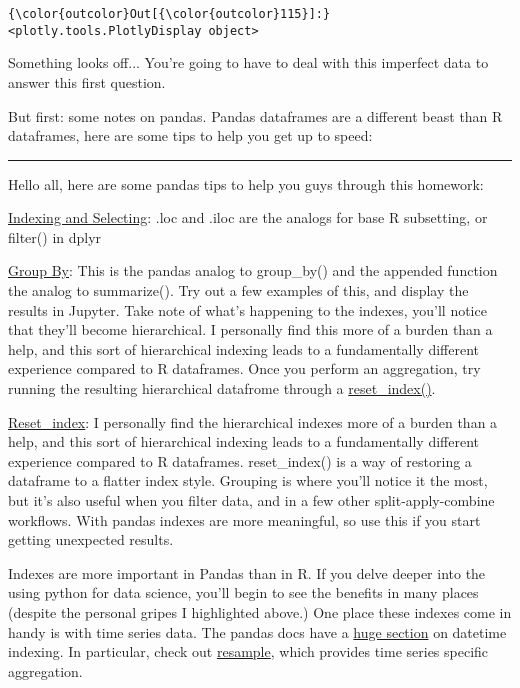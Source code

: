 \documentclass[11pt]{article}
\begin{document}
\begin{Verbatim}[commandchars=\\\{\}]
{\color{outcolor}Out[{\color{outcolor}115}]:} <plotly.tools.PlotlyDisplay object>
\end{Verbatim}
            
    Something looks off... You're going to have to deal with this imperfect
data to answer this first question.

But first: some notes on pandas. Pandas dataframes are a different beast
than R dataframes, here are some tips to help you get up to speed:

\begin{center}\rule{0.5\linewidth}{\linethickness}\end{center}

Hello all, here are some pandas tips to help you guys through this
homework:

\href{https://pandas.pydata.org/pandas-docs/stable/indexing.html}{Indexing
and Selecting}: .loc and .iloc are the analogs for base R subsetting, or
filter() in dplyr

\href{https://pandas.pydata.org/pandas-docs/stable/groupby.html}{Group
By}: This is the pandas analog to group\_by() and the appended function
the analog to summarize(). Try out a few examples of this, and display
the results in Jupyter. Take note of what's happening to the indexes,
you'll notice that they'll become hierarchical. I personally find this
more of a burden than a help, and this sort of hierarchical indexing
leads to a fundamentally different experience compared to R dataframes.
Once you perform an aggregation, try running the resulting hierarchical
datafrome through a
\href{https://pandas.pydata.org/pandas-docs/stable/generated/pandas.DataFrame.reset_index.html}{reset\_index()}.

\href{https://pandas.pydata.org/pandas-docs/stable/generated/pandas.DataFrame.reset_index.html}{Reset\_index}:
I personally find the hierarchical indexes more of a burden than a help,
and this sort of hierarchical indexing leads to a fundamentally
different experience compared to R dataframes. reset\_index() is a way
of restoring a dataframe to a flatter index style. Grouping is where
you'll notice it the most, but it's also useful when you filter data,
and in a few other split-apply-combine workflows. With pandas indexes
are more meaningful, so use this if you start getting unexpected
results.

Indexes are more important in Pandas than in R. If you delve deeper into
the using python for data science, you'll begin to see the benefits in
many places (despite the personal gripes I highlighted above.) One place
these indexes come in handy is with time series data. The pandas docs
have a
\href{http://pandas.pydata.org/pandas-docs/stable/timeseries.html}{huge
section} on datetime indexing. In particular, check out
\href{https://pandas.pydata.org/pandas-docs/stable/generated/pandas.DataFrame.resample.html}{resample},
which provides time series specific aggregation.
\end{document}
